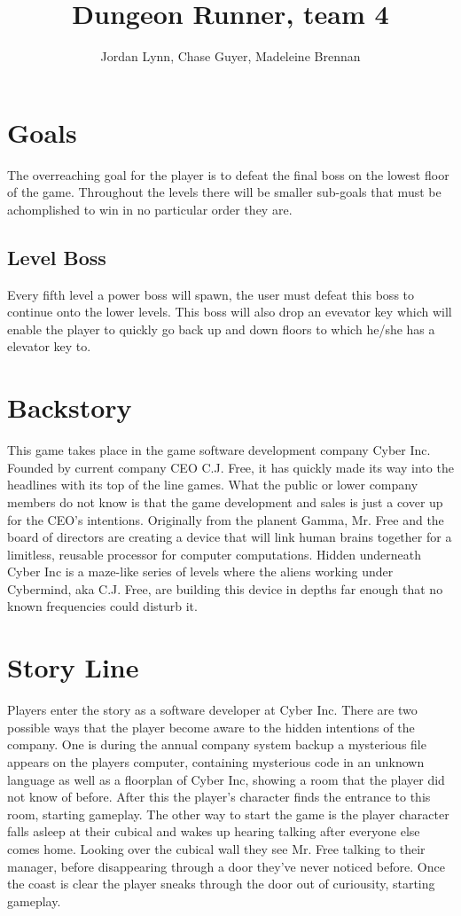 \documentclass[11pt]{article}
\title{Dungeon Runner, team 4}
\author{Jordan Lynn, Chase Guyer, Madeleine Brennan}
\begin{document}
    \maketitle

    \section{Goals}
    The overreaching goal for the player is to defeat the final boss on the lowest floor of the game. Throughout the levels there will be smaller sub-goals that must be achomplished to win in no particular order they are.
        \subsection{Level Boss}
            Every fifth level a power boss will spawn, the user must defeat this boss to continue onto the lower levels. This boss will also drop an evevator key which will enable the player to quickly go back up and down floors to which he/she has a elevator key to.
    
    \section{Backstory}
    This game takes place in the game software development company Cyber Inc. Founded by current company CEO C.J. Free, it has quickly made its way into the headlines with its top of the line games. What the public or lower company members do not know is that the game development and sales is just a cover up for the CEO's intentions. Originally from the planent Gamma, Mr. Free and the board of directors are creating a device that will link human brains together for a limitless, reusable processor for computer computations. Hidden underneath Cyber Inc is a maze-like series of levels where the aliens working under Cybermind, aka C.J. Free, are building this device in depths far enough that no known frequencies could disturb it. 

    \section{Story Line}
    Players enter the story as a software developer at Cyber Inc. There are two possible ways that the player become aware to the hidden intentions of the company. One is during the annual company system backup a mysterious file appears on the players computer, containing mysterious code in an unknown language as well as a floorplan of Cyber Inc, showing a room that the player did not know of before. After this the player's character finds the entrance to this room, starting gameplay. The other way to start the game is the player character falls asleep at their cubical and wakes up hearing talking after everyone else comes home. Looking over the cubical wall they see Mr. Free talking to their manager, before disappearing through a door they've never noticed before. Once the coast is clear the player sneaks through the door out of curiousity, starting gameplay.
\end{document}

